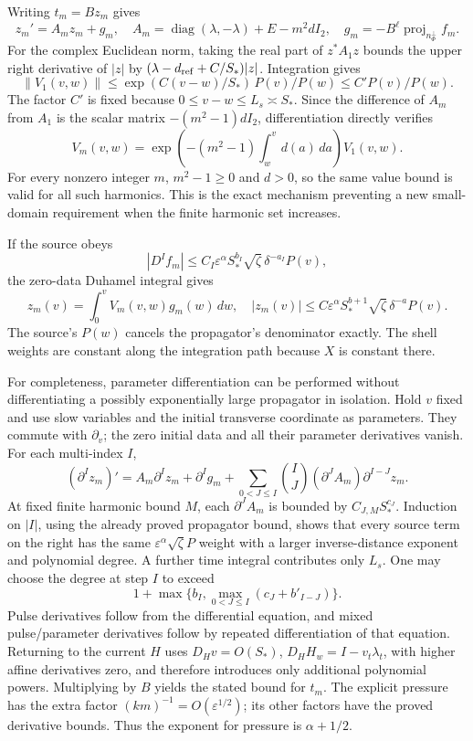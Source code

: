 \documentclass[10pt,a4paper]{article}
\begin{document}
Writing \(t_m=Bz_m\) gives \[
z_m'=A_mz_m+g_m,\quad
A_m=\operatorname{diag}(\lambda,-\lambda)+E-m^2dI_2,
\quad g_m=-B^\ell\operatorname{proj}_{n_\Phi^\perp}f_m.
\] For the complex Euclidean norm, taking the real part of \(z^*A_1z\) bounds the upper right derivative of \(|z|\) by \((\lambda-d_{\rm ref}+C/S_*)|z|\). Integration gives \[
\|V_1(v,w)\|\le
\exp(C(v-w)/S_*)\,P(v)/P(w)\le C'P(v)/P(w).
\] The factor \(C'\) is fixed because \(0\le v-w\le L_s\asymp S_*\). Since the difference of \(A_m\) from \(A_1\) is the scalar matrix \(-(m^2-1)dI_2\), differentiation directly verifies \[
V_m(v,w)=\exp\left(-(m^2-1)\int_w^v d(a)\,da\right)V_1(v,w).
\] For every nonzero integer \(m\), \(m^2-1\ge0\) and \(d>0\), so the same value bound is valid for all such harmonics. This is the exact mechanism preventing a new small-domain requirement when the finite harmonic set increases.

If the source obeys \[
|D^If_m|\le C_I\varepsilon^\alpha S_*^{b_I}
\sqrt\zeta\,\delta^{-a_I}P(v),
\] the zero-data Duhamel integral gives \[
z_m(v)=\int_0^vV_m(v,w)g_m(w)\,dw,\quad
|z_m(v)|\le C\varepsilon^\alpha S_*^{b+1}
\sqrt\zeta\,\delta^{-a}P(v).
\] The source's \(P(w)\) cancels the propagator's denominator exactly. The shell weights are constant along the integration path because \(X\) is constant there.

For completeness, parameter differentiation can be performed without differentiating a possibly exponentially large propagator in isolation. Hold \(v\) fixed and use slow variables and the initial transverse coordinate as parameters. They commute with \(\partial_v\); the zero initial data and all their parameter derivatives vanish. For each multi-index \(I\), \[
(\partial^Iz_m)'=A_m\partial^Iz_m+\partial^Ig_m+
\sum_{0<J\le I}\binom IJ(\partial^JA_m)\partial^{I-J}z_m.
\] At fixed finite harmonic bound \(M\), each \(\partial^JA_m\) is bounded by \(C_{J,M}S_*^{c_J}\). Induction on \(|I|\), using the already proved propagator bound, shows that every source term on the right has the same \(\varepsilon^\alpha\sqrt\zeta P\) weight with a larger inverse-distance exponent and polynomial degree. A further time integral contributes only \(L_s\). One may choose the degree at step \(I\) to exceed \[
1+\max\{b_I,\max_{0<J\le I}(c_J+b'_{I-J})\}.
\] Pulse derivatives follow from the differential equation, and mixed pulse/parameter derivatives follow by repeated differentiation of that equation. Returning to the current \(H\) uses \(D_Hv=O(S_*)\), \(D_HH_w=I-v_t\lambda_t\), with higher affine derivatives zero, and therefore introduces only additional polynomial powers. Multiplying by \(B\) yields the stated bound for \(t_m\). The explicit pressure has the extra factor \((km)^{-1}=O(\varepsilon^{1/2})\); its other factors have the proved derivative bounds. Thus the exponent for pressure is \(\alpha+1/2\).
\end{document}
